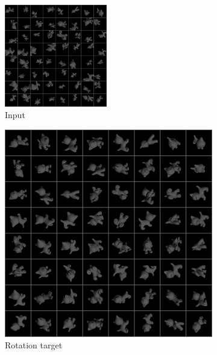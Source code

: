 \documentclass[10pt,a4paper]{article}
\begin{document}
\begin{figure}[!ht]
    \centering
    \begin{subfigure}{\textwidth}
        \centering
        \includegraphics[width=0.49\textwidth] {cat_input.png}
        \caption{Input}
        \label{cat_in}
    \end{subfigure}
    \begin{subfigure}{0.3\textwidth}
        \centering
        \includegraphics[width=\textwidth] {cat_target0.png}
        \caption{Rotation target}
        \label{cat_r}
    \end{subfigure}
    \begin{subfigure}{0.3\textwidth}
        \centering

\end{subfigure}
\end{figure}
\end{document}
